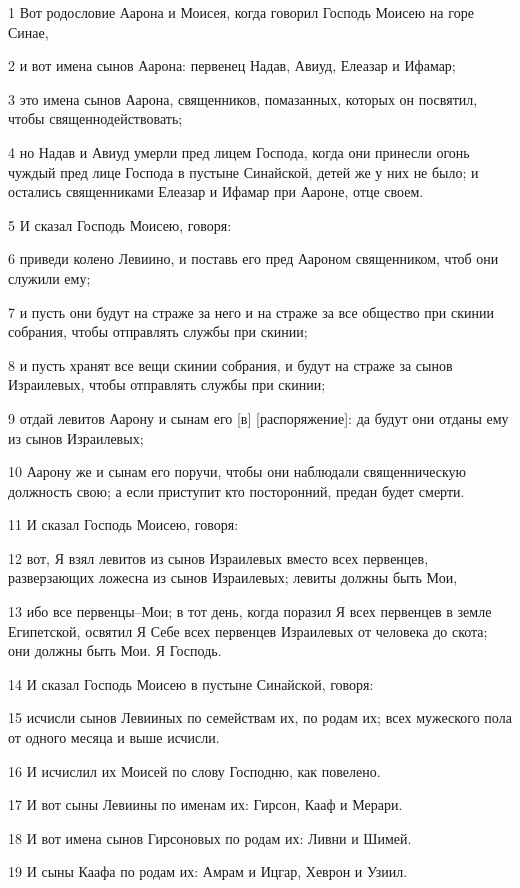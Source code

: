 \par 1 Вот родословие Аарона и Моисея, когда говорил Господь Моисею на горе Синае,
\par 2 и вот имена сынов Аарона: первенец Надав, Авиуд, Елеазар и Ифамар;
\par 3 это имена сынов Аарона, священников, помазанных, которых он посвятил, чтобы священнодействовать;
\par 4 но Надав и Авиуд умерли пред лицем Господа, когда они принесли огонь чуждый пред лице Господа в пустыне Синайской, детей же у них не было; и остались священниками Елеазар и Ифамар при Аароне, отце своем.
\par 5 И сказал Господь Моисею, говоря:
\par 6 приведи колено Левиино, и поставь его пред Аароном священником, чтоб они служили ему;
\par 7 и пусть они будут на страже за него и на страже за все общество при скинии собрания, чтобы отправлять службы при скинии;
\par 8 и пусть хранят все вещи скинии собрания, и будут на страже за сынов Израилевых, чтобы отправлять службы при скинии;
\par 9 отдай левитов Аарону и сынам его [в] [распоряжение]: да будут они отданы ему из сынов Израилевых;
\par 10 Аарону же и сынам его поручи, чтобы они наблюдали священническую должность свою; а если приступит кто посторонний, предан будет смерти.
\par 11 И сказал Господь Моисею, говоря:
\par 12 вот, Я взял левитов из сынов Израилевых вместо всех первенцев, разверзающих ложесна из сынов Израилевых; левиты должны быть Мои,
\par 13 ибо все первенцы--Мои; в тот день, когда поразил Я всех первенцев в земле Египетской, освятил Я Себе всех первенцев Израилевых от человека до скота; они должны быть Мои. Я Господь.
\par 14 И сказал Господь Моисею в пустыне Синайской, говоря:
\par 15 исчисли сынов Левииных по семействам их, по родам их; всех мужеского пола от одного месяца и выше исчисли.
\par 16 И исчислил их Моисей по слову Господню, как повелено.
\par 17 И вот сыны Левиины по именам их: Гирсон, Кааф и Мерари.
\par 18 И вот имена сынов Гирсоновых по родам их: Ливни и Шимей.
\par 19 И сыны Каафа по родам их: Амрам и Ицгар, Хеврон и Узиил.
